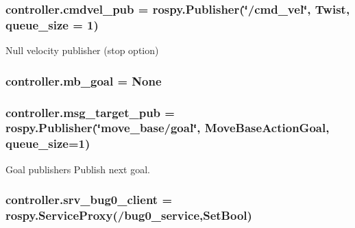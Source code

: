 \subsubsection[{\texorpdfstring{cmdvel\+\_\+pub}{cmdvel_pub}}]{\setlength{\rightskip}{0pt plus 5cm}controller.\+cmdvel\+\_\+pub = rospy.\+Publisher(\char`\"{}/cmd\+\_\+vel\char`\"{}, Twist, queue\+\_\+size = 1)}\hypertarget{namespacecontroller_ac5bba2b88eaa622e94ba61133ac349fa}{}\label{namespacecontroller_ac5bba2b88eaa622e94ba61133ac349fa}


Null velocity publisher (stop option) 

\subsubsection[{\texorpdfstring{mb\+\_\+goal}{mb_goal}}]{\setlength{\rightskip}{0pt plus 5cm}controller.\+mb\+\_\+goal = None}\hypertarget{namespacecontroller_a0f904cc2eef40a1c5ce7629120e3670a}{}\label{namespacecontroller_a0f904cc2eef40a1c5ce7629120e3670a}
\subsubsection[{\texorpdfstring{msg\+\_\+target\+\_\+pub}{msg_target_pub}}]{\setlength{\rightskip}{0pt plus 5cm}controller.\+msg\+\_\+target\+\_\+pub = rospy.\+Publisher(\char`\"{}move\+\_\+base/goal\char`\"{}, Move\+Base\+Action\+Goal, queue\+\_\+size=1)}\hypertarget{namespacecontroller_a07e67d3edbf36beb640f1be1f23ac99c}{}\label{namespacecontroller_a07e67d3edbf36beb640f1be1f23ac99c}


Goal publishers Publish next goal. 

\subsubsection[{\texorpdfstring{srv\+\_\+bug0\+\_\+client}{srv_bug0_client}}]{\setlength{\rightskip}{0pt plus 5cm}controller.\+srv\+\_\+bug0\+\_\+client = rospy.\+Service\+Proxy(\textquotesingle{}/bug0\+\_\+service\textquotesingle{},Set\+Bool)}\hypertarget{namespacecontroller_ac783da4ecabafe9488d3b5ceeb0f839d}{}\label{namespacecontroller_ac783da4ecabafe9488d3b5ceeb0f839d}
